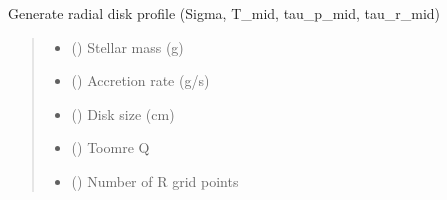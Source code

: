\documentclass[a4paper,11pt,english]{sphinxmanual}
\begin{document}
\begin{fulllineitems}
\begin{fulllineitems}
\label{\detokenize{x22:disk_model.DiskModel.generate_disk_profile}}
\pysigstartsignatures
\pysiglinewithargsret
{}
{\sphinxparamcomma {}\sphinxparamcomma {}\sphinxparamcomma {}\sphinxparamcomma {}\sphinxparamcomma {}\sphinxparamcomma {}}
{}
\pysigstopsignatures
\sphinxAtStartPar
Generate radial disk profile (Sigma, T\_mid, tau\_p\_mid, tau\_r\_mid)
\begin{quote}\begin{description}
\begin{itemize}
\item {} 
\sphinxAtStartPar
{} () \textendash{} Stellar mass (g)

\item {} 
\sphinxAtStartPar
{} () \textendash{} Accretion rate (g/s)

\item {} 
\sphinxAtStartPar
{} () \textendash{} Disk size (cm)

\item {} 
\sphinxAtStartPar
{} () \textendash{} Toomre Q

\item {} 
\sphinxAtStartPar
{} () \textendash{} Number of R grid points

\end{itemize}

\end{description}\end{quote}


\end{fulllineitems}
\end{fulllineitems}
\end{document}
